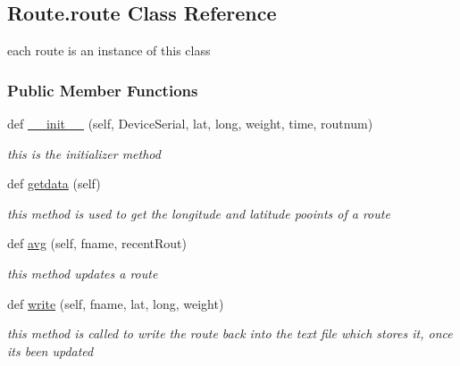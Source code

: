 \hypertarget{class_route_1_1route}{}\subsection{Route.\+route Class Reference}
\label{class_route_1_1route}


each route is an instance of this class  


\subsubsection*{Public Member Functions}
\begin{DoxyCompactItemize}
\item 
\mbox{\label{class_route_1_1route_a7dc014300e42205ff44d8f9c25b2ff8b}} 
def \mbox{\hyperlink{class_route_1_1route_a7dc014300e42205ff44d8f9c25b2ff8b}{\+\_\+\+\_\+init\+\_\+\+\_\+}} (self, Device\+Serial, lat, long, weight, time, routnum)
\begin{DoxyCompactList}\small\item\em this is the initializer method \end{DoxyCompactList}\item 
def \mbox{\hyperlink{class_route_1_1route_a52023b570a22876d84fb67395dc7fbeb}{getdata}} (self)
\begin{DoxyCompactList}\small\item\em this method is used to get the longitude and latitude pooints of a route \end{DoxyCompactList}\item 
def \mbox{\hyperlink{class_route_1_1route_a00d420899160e63206c2906f3bde69bb}{avg}} (self, fname, recent\+Rout)
\begin{DoxyCompactList}\small\item\em this method updates a route \end{DoxyCompactList}\item 
\mbox{\label{class_route_1_1route_acb3a4ef06712d7690b6afd3efb7e30ee}} 
def \mbox{\hyperlink{class_route_1_1route_acb3a4ef06712d7690b6afd3efb7e30ee}{write}} (self, fname, lat, long, weight)
\begin{DoxyCompactList}\small\item\em this method is called to write the route back into the text file which stores it, once it\textquotesingle{}s been updated \end{DoxyCompactList}\end{DoxyCompactItemize}

